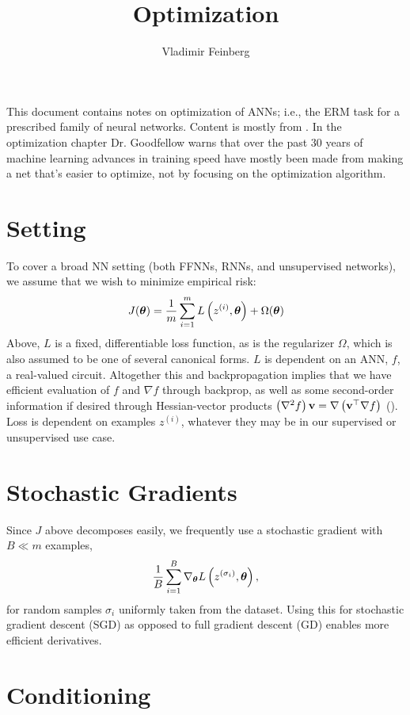 \documentclass{article}
\title{Optimization}
\author{Vladimir Feinberg}
\begin{document}
\maketitle

This document contains notes on optimization of ANNs; i.e., the ERM task for a prescribed family of neural networks. Content is mostly from . In the optimization chapter Dr. Goodfellow warns that over the past 30 years of machine learning advances in training speed have mostly been made from making a net that's easier to optimize, not by focusing on the optimization algorithm.

\section{Setting}

To cover a broad NN setting (both FFNNs, RNNs, and unsupervised networks), we assume that we wish to minimize empirical risk:
$$
J({\boldsymbol\theta})=\frac{1}{m}\sum_{i=1}^mL\left({z^{(i)}, {\boldsymbol\theta}}\right) + \Omega({\boldsymbol\theta})
$$
Above, $L$ is a fixed, differentiable loss function, as is the regularizer $\Omega$, which is also assumed to be one of several canonical forms. $L$ is dependent on an ANN, $f$, a real-valued circuit. Altogether this and backpropagation implies that we have efficient evaluation of $f$ and $\nabla f$ through backprop, as well as some second-order information if desired through Hessian-vector products $\left({\nabla^2 f}\right)\textbf{v}=\nabla\left({\textbf{v}^\top\nabla f}\right)$ (). Loss is dependent on examples $z^{(i)}$, whatever they may be in our supervised or unsupervised use case.

\section{Stochastic Gradients}

Since $J$ above decomposes easily, we frequently use a stochastic gradient with $B\ll m$ examples,
$$\frac{1}{B}\sum_{i=1}^B\nabla_{\boldsymbol\theta} L\left({z^{(\sigma_i)}, {\boldsymbol\theta}}\right),$$ for random samples $\sigma_i$ uniformly taken from the dataset. Using this for stochastic gradient descent (SGD) as opposed to full gradient descent (GD) enables more efficient derivatives.

\section{Conditioning}
\end{document}
